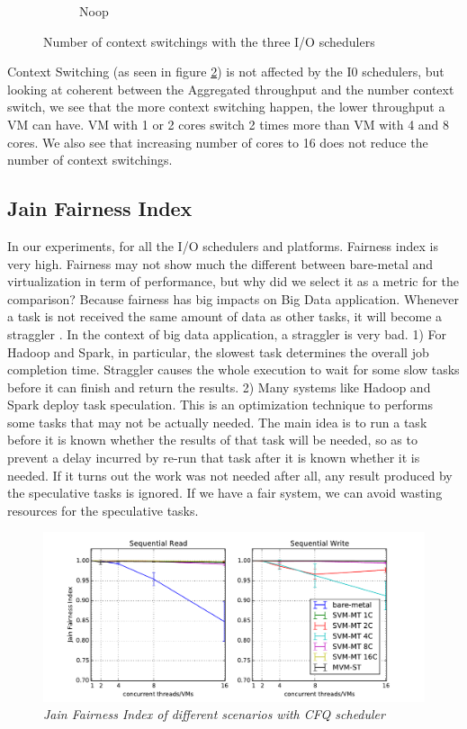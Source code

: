 \documentclass{acmsig}
\begin{document}
\begin{figure}[t]
\begin{subfigure}[b]{0.3\textwidth}
     \caption{Noop}
     \label{fig:contextswitching_noop_write}
   \end{subfigure}
   \caption{Number of context switchings with the three I/O schedulers}\label{fig:contextswitching}
\end{figure}

Context Switching (as seen in figure \ref{fig:contextswitching}) is not affected by the I0 schedulers, but looking at coherent between the Aggregated throughput and the number context switch, we see that the more context switching happen, the lower throughput a VM can have. VM with 1 or 2 cores switch 2 times more than VM with 4 and 8 cores. We also see that increasing number of cores to 16 does not reduce the number of context switchings.

\subsection{Jain Fairness Index}
In our experiments, for all the I/O schedulers and platforms. Fairness index is very high. Fairness may not show much the different between bare-metal and virtualization in term of performance, but why did we select it as a metric for the comparison? Because fairness has big impacts on Big Data application. Whenever a task is not received the same amount of data as other tasks, it will become a straggler \cite{matei08}. In the context of big data application, a straggler is very bad. 1) For Hadoop and Spark, in particular, the slowest task determines the overall job completion time. Straggler causes the whole execution to wait for some slow tasks before it can finish and return the results. 2) Many systems like Hadoop and Spark deploy task speculation. This is an optimization technique to performs some tasks that may not be actually needed. The main idea is to run a task before it is known whether the results of that task will be needed, so as to prevent a delay incurred by re-run that task after it is known whether it is needed. If it turns out the work was not needed after all, any result produced by the speculative tasks is ignored. If we have a fair system, we can avoid wasting resources for the speculative tasks.

\begin{figure}[t]
  \includegraphics[scale=0.85]{figures/JFI.pdf}
  \caption{\textit{Jain Fairness Index of different scenarios with CFQ scheduler}}
  \label{fig:jfi}
\end{figure}
\end{document}
